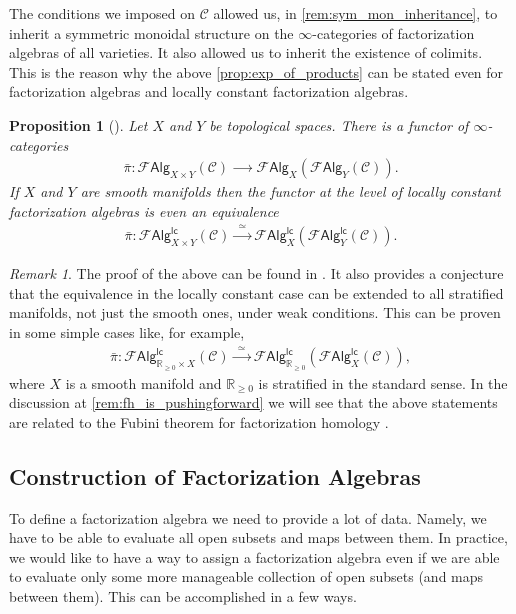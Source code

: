 \documentclass[12pt,a4paper]{article}
\newcounter{counter} \numberwithin{counter}{section}
\theoremstyle{definition}
\theoremstyle{plain}
\newtheorem{proposition}[counter]{Proposition}
\theoremstyle{remark}
\newtheorem{remark}[counter]{Remark}
\newcommand{\catC}{\mathscr{C}}
\newcommand{\falg}{\mathscr{F} \mathsf{Alg}}
\newcommand{\lcfa}{\mathscr{F} \mathsf{Alg}^{\mathsf{lc}}}
\newcommand{\hoint}{\mathbb{R}_{\geq 0}}
\begin{document}
The conditions we imposed on $\catC$ allowed us, in \cref{rem:sym_mon_inheritance}, to inherit a symmetric monoidal structure on the $\infty$-categories of factorization algebras of all varieties. It also allowed us to inherit the existence of colimits. This is the reason why the above \cref{prop:exp_of_products} can be stated even for factorization algebras and locally constant factorization algebras.

\begin{proposition}[\cite{ginot2015}]\label{prop:exp_of_products_lc}
    Let $X$ and $Y$ be topological spaces. There is a functor of $\infty$-categories
    \begin{align}
        \bar{\pi}: \falg_{X \times Y}(\catC) \xrightarrow{\qquad} \falg_{X}(\falg_{Y}(\catC)).
    \end{align}
    If $X$ and $Y$ are smooth manifolds then the functor at the level of locally constant factorization algebras is even an equivalence
    \begin{align}
        \bar{\pi}: \lcfa_{X \times Y}(\catC) \xrightarrow{\ \ \simeq \ \ } \lcfa_{X}(\lcfa_{Y}(\catC)).
    \end{align}
\end{proposition}

\begin{remark}\label{rem:hoint_times_X_conjecture}
    The proof of the above can be found in \cite[prop.18]{ginot2015}. It also provides a conjecture that the equivalence in the locally constant case can be extended to all stratified manifolds, not just the smooth ones, under weak conditions. This can be proven in some simple cases like, for example,
    \begin{align}
        \bar{\pi}: \lcfa_{\hoint \times X} (\catC) \xrightarrow{\ \ \simeq \ \ } \lcfa_{\hoint} (\lcfa_X (\catC)),
    \end{align}
    where $X$ is a smooth manifold and $\hoint$ is stratified in the standard sense. In the discussion at \cref{rem:fh_is_pushingforward} we will see that the above statements are related to the Fubini theorem for factorization homology \cite[cor.2.29]{aft_fhstrat}.
\end{remark}


\subsection{Construction of Factorization Algebras}

To define a factorization algebra we need to provide a lot of data. Namely, we have to be able to evaluate all open subsets and maps between them. In practice, we would like to have a way to assign a factorization algebra even if we are able to evaluate only some more manageable collection of open subsets (and maps between them). This can be accomplished in a few ways. 
\end{document}
